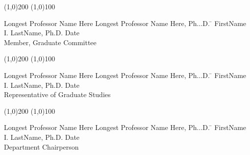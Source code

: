   \noindent
\line(1,0){200} \hspace{40 mm} \line(1,0){100}\\
  \noindent
\vspace{-1.75\baselineskip}
  \begin{tabbing}
Longest Professor Name Here Longest Professor Name Here, Ph...D.   \=  \kill 
FirstName I. LastName, Ph.D. \>  Date\\Member, Graduate Committee %
\end{tabbing}



  \noindent
\line(1,0){200} \hspace{40 mm} \line(1,0){100}\\
  \noindent
\vspace{-1.75\baselineskip}
  \begin{tabbing}
Longest Professor Name Here Longest Professor Name Here, Ph...D.  \=  \kill 
FirstName I. LastName, Ph.D. \>  Date\\Representative of Graduate Studies  %
\end{tabbing}


  \noindent
  \line(1,0){200} \hspace{40 mm} \line(1,0){100}\\
  \noindent
\vspace{-1.75\baselineskip}
  \begin{tabbing}
Longest Professor Name Here Longest Professor Name Here, Ph...D.  \=  \kill 
FirstName I. LastName, Ph.D. \>  Date\\Department Chairperson  %
\end{tabbing}